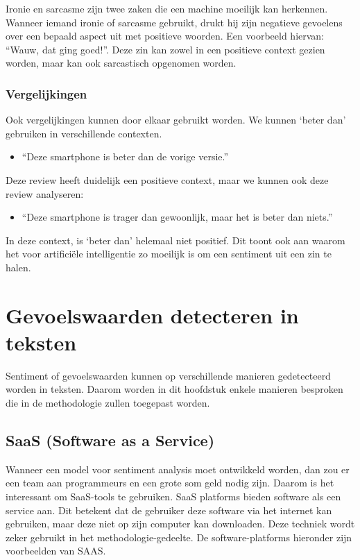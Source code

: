 Ironie en sarcasme zijn twee zaken die een machine moeilijk kan herkennen. Wanneer iemand ironie of sarcasme gebruikt, drukt hij zijn negatieve gevoelens over een bepaald aspect uit met positieve woorden. \autocite{MonkeyLearn2021} Een voorbeeld hiervan: “Wauw, dat ging goed!”. Deze zin kan zowel in een positieve context gezien worden, maar kan ook sarcastisch opgenomen worden. 

\subsubsection{Vergelijkingen}
\label{vergelijkingen}

Ook vergelijkingen kunnen door elkaar gebruikt worden. We kunnen ‘beter dan’ gebruiken in verschillende contexten. 

\begin{itemize}
    \item “Deze smartphone is beter dan de vorige versie.”
\end{itemize}

Deze review heeft duidelijk een positieve context, maar we kunnen ook deze review analyseren:


\begin{itemize}
    \item “Deze smartphone is trager dan gewoonlijk, maar het is beter dan niets.”
\end{itemize}

In deze context, is ‘beter dan’ helemaal niet positief. Dit toont ook aan waarom het voor artificiële intelligentie zo moeilijk is om een sentiment uit een zin te halen. 


\section{Gevoelswaarden detecteren in teksten}
\label{gevoelswaardendetecteren}

Sentiment of gevoelswaarden kunnen op verschillende manieren gedetecteerd worden in teksten. Daarom worden in dit hoofdstuk enkele manieren besproken die in de methodologie zullen toegepast worden. 

\subsection{SaaS (Software as a Service)}
\label{saas}

Wanneer een model voor sentiment analysis moet ontwikkeld worden, dan zou er een team aan programmeurs en een grote som geld nodig zijn. Daarom is het interessant om SaaS-tools te gebruiken. SaaS platforms bieden software als een service aan. Dit betekent dat de gebruiker deze software via het internet kan gebruiken, maar deze niet op zijn computer kan downloaden. \autocite{Marketing2021} Deze techniek wordt zeker gebruikt in het methodologie-gedeelte. De software-platforms hieronder zijn voorbeelden van \gls{SAAS}. 


